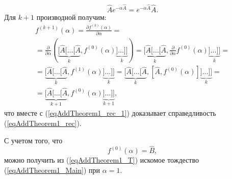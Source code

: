 \begin{equation}
\hat{A}e^{-\alpha\hat{A}} = e^{-\alpha\hat{A}} \hat{A}.
\nonumber
\end{equation}
Для $k+1$ производной получим:
\begin{eqnarray}
f^{(k + 1)}\left(\alpha\right) = 
\frac{\partial f^{(k)}\left(\alpha\right)}{\partial \alpha} =
\nonumber \\
=\frac{\partial }{\partial \alpha}
\left(
\underbrace{
[\hat{A}[\dots[\hat{A}}_{k},
f^{(0)}\left(\alpha\right)
\underbrace{]\dots]]}_{k} \right) =  
\underbrace{
[\hat{A}[\dots[\hat{A}}_{k},
\frac{\partial }{\partial \alpha}f^{(0)}\left(\alpha\right)
\underbrace{]\dots]]}_{k} =
\nonumber \\
= 
\underbrace{
[\hat{A}[\dots[\hat{A}}_{k},
f^{(1)}\left(\alpha\right)
\underbrace{]\dots]]}_{k} =
\underbrace{
[\hat{A}[\dots[\hat{A}}_{k},
\left[\hat{A}, f^{(0)}\left(\alpha\right)\right]
\underbrace{]\dots]]}_{k} =
\nonumber \\
=
\underbrace{
[\hat{A}[\dots[\hat{A}}_{k + 1},
f^{(0)}\left(\alpha\right)
\underbrace{]\dots]]}_{k + 1},
\nonumber
\end{eqnarray}
что вместе с (\ref{eqAddTheorem1_rec_1}) доказывает справедливость 
(\ref{eqAddTheorem1_rec}).

С учетом того, что 
\begin{equation}
f^{(0)}\left(\alpha\right) = \hat{B},
\nonumber
\end{equation}
можно получить из (\ref{eqAddTheorem1_T}) искомое тождество
(\ref{eqAddTheorem1_Main}) при $\alpha = 1$. 


